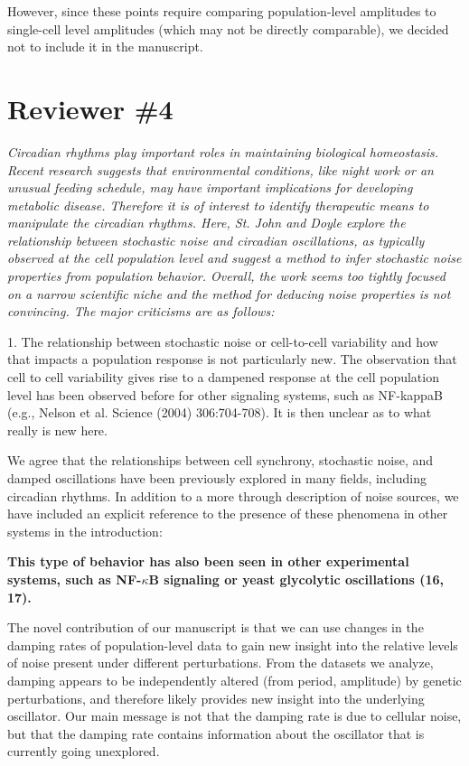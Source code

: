 \documentclass[11pt, letterpaper]{article}
\newenvironment{reviewer}{\itshape\color{gray}}{}
\newenvironment{manuscript}[1]{\begin{center}\begin{tcolorbox}[colback=green!5!white,colframe=green!75!black,width=\textwidth,title={#1},breakable,fonttitle=\bfseries]}{\end{tcolorbox}\end{center}}
\begin{document}
However, since these points require comparing population-level amplitudes to single-cell level amplitudes (which may not be directly comparable), we decided not to include it in the manuscript.

\section*{Reviewer \#4}

\begin{reviewer}
Circadian rhythms play important roles in maintaining biological homeostasis. Recent research suggests that environmental conditions, like night work or an unusual feeding schedule, may have important implications for developing metabolic disease. Therefore it is of interest to identify therapeutic means to manipulate the circadian rhythms. Here, St. John and Doyle explore the relationship between stochastic noise and circadian oscillations, as typically observed at the cell population level and suggest a method to infer stochastic noise properties from population behavior. Overall, the work seems too tightly focused on a narrow scientific niche and the method for deducing noise properties is not convincing. The major criticisms are as follows:

1. The relationship between stochastic noise or cell-to-cell variability and how that impacts a population response is not particularly new. The observation that cell to cell variability gives rise to a dampened response at the cell population level has been observed before for other signaling systems, such as NF-kappaB (e.g., Nelson et al. Science (2004) 306:704-708). It is then unclear as to what really is new here.
\end{reviewer}

We agree that the relationships between cell synchrony, stochastic noise, and damped oscillations have been previously explored in many fields, including circadian rhythms. In addition to a more through description of noise sources, we have included an explicit reference to the presence of these phenomena in other systems in the introduction:

\begin{manuscript}{Page 3}
  {\bfseries This type of behavior has also been seen in
  other experimental systems, such as NF-$\kappa$B signaling or yeast glycolytic oscillations (16, 17).}
\end{manuscript}

The novel contribution of our manuscript is that we can use changes in the damping rates of population-level data to gain new insight into the relative levels of noise present under different perturbations.
From the datasets we analyze, damping appears to be independently altered (from period, amplitude) by genetic perturbations, and therefore likely provides new insight into the underlying oscillator.
Our main message is not that the damping rate is due to cellular noise, but that the damping rate contains information about the oscillator that is currently going unexplored.
\end{document}
